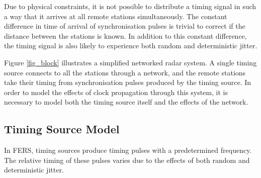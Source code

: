 \documentclass[a4paper,10pt]{article}
\begin{document}
Due to physical constraints, it is not possible to distribute a timing signal in such a way that it arrives at all remote stations simultaneously. The constant difference in time of arrival of synchronisation pulses is trivial to correct if the distance between the stations is known. In addition to this constant difference, the timing signal is also likely to experience both random and deterministic jitter\cite{maxim}.

Figure \ref{fig_block} illustrates a simplified networked radar system. A single timing source connects to all the stations through a network, and the remote stations take their timing from synchronisation pulses produced by the timing source. In order to model the effects of clock propagation through this system, it is necessary to model both the timing source itself and the effects of the network.

\subsection{Timing Source Model}
In FERS, timing sources produce timing pulses with a predetermined frequency. The relative timing of these pulses varies due to the effects of both random and deterministic jitter.



\end{document}
